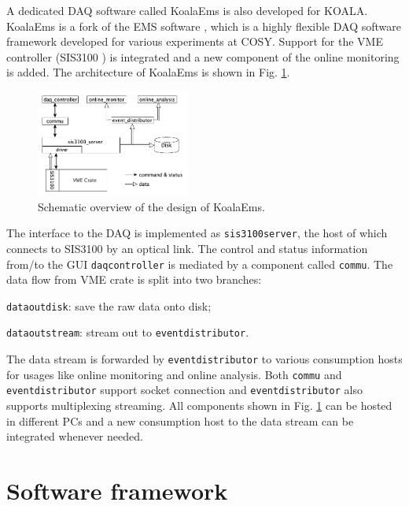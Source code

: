 \documentclass[number,5p]{elsarticle}
\begin{document}
A dedicated DAQ software called KoalaEms is also developed for KOALA.
KoalaEms is a fork of the EMS software \cite{ems}, which is a highly flexible DAQ software framework developed for various experiments at COSY.
Support for the VME controller (SIS3100 \cite{sis}) is integrated and a new
component of the online monitoring is added.
The architecture of KoalaEms is shown in Fig. \ref{fig:koalaems}.
\begin{figure}[htbp]
  \centering
  \includegraphics[width=0.45\textwidth]{./koalaems_deployment.png}
  \caption{Schematic overview of the design of KoalaEms.}
  \label{fig:koalaems}
\end{figure}
The interface to the DAQ is implemented as \texttt{sis3100\textunderscore server}, the host of which
connects to SIS3100 by an optical link.
The control and status information from/to the GUI \texttt{daq\textunderscore controller} is mediated by a component called \texttt{commu}.
The data flow from VME crate is split into two branches:
\begin{enumerate*}[label=(\roman*)]
\item \texttt{data\textunderscore out\textunderscore di\allowbreak sk}: save the raw data onto disk;
\item \texttt{data\textunderscore out\textunderscore stream}: stream out to \texttt{event\textunderscore distributor}.
\end{enumerate*}
The data stream is forwarded by \texttt{event\textunderscore distributor} to various consumption hosts for usages like online monitoring and online analysis.
Both \texttt{commu} and \texttt{event\textunderscore distributor} support socket connection and \texttt{event\textunderscore distributor} also supports multiplexing streaming.
All components shown in Fig. \ref{fig:koalaems} can be hosted in different PCs
and a new consumption host to the data stream can be integrated whenever needed.

\section{Software framework}
\label{sec:software}
\end{document}

